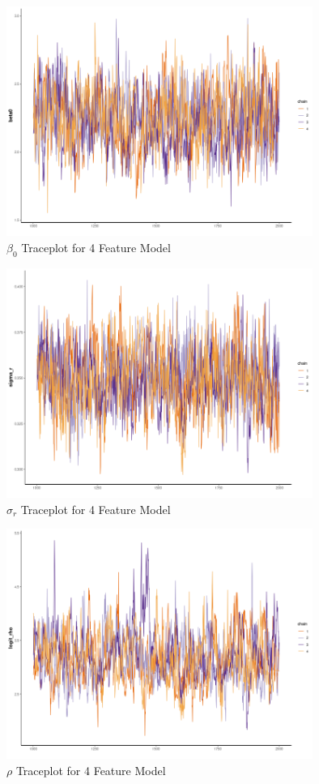 \documentclass[11pt]{article}
\begin{document}
\begin{figure}[h!] 
	\centering
  \includegraphics[height=75mm]{traceplot_beta0.png}
  \caption{$\beta_0$ Traceplot for 4 Feature Model}
  \label{fig:tbeta0}
\end{figure}

\begin{figure}[h!] 
	\centering
  \includegraphics[height=75mm]{traceplot_sigma_r.png}
  \caption{$\sigma_r$ Traceplot for 4 Feature Model}
  \label{fig:tsigma_r}
\end{figure}

\begin{figure}[h!] 
	\centering
  \includegraphics[height=75mm]{traceplot_logit_rho.png}
  \caption{$\rho$ Traceplot for 4 Feature Model}
  \label{fig:tlogit_rho}
\end{figure}
\end{document}

